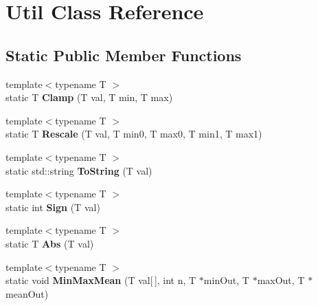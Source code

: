 \hypertarget{class_util}{
\section{\-Util \-Class \-Reference}
\label{class_util}
}
\subsection*{\-Static \-Public \-Member \-Functions}
\begin{DoxyCompactItemize}
\item 
\hypertarget{class_util_ae96fb04ebf846f501ebd96d7455027a9}{
{\footnotesize template$<$typename T $>$ }\\static \-T {\bfseries \-Clamp} (\-T val, \-T min, \-T max)}
\label{class_util_ae96fb04ebf846f501ebd96d7455027a9}

\item 
\hypertarget{class_util_a104bdc57a1eba1e8863f8139985e9b05}{
{\footnotesize template$<$typename T $>$ }\\static \-T {\bfseries \-Rescale} (\-T val, \-T min0, \-T max0, \-T min1, \-T max1)}
\label{class_util_a104bdc57a1eba1e8863f8139985e9b05}

\item 
\hypertarget{class_util_a120427fa00fd2e48bcc5b48088aeef84}{
{\footnotesize template$<$typename T $>$ }\\static std\-::string {\bfseries \-To\-String} (\-T val)}
\label{class_util_a120427fa00fd2e48bcc5b48088aeef84}

\item 
\hypertarget{class_util_ae608455719c51e7478f56a1366f50a1e}{
{\footnotesize template$<$typename T $>$ }\\static int {\bfseries \-Sign} (\-T val)}
\label{class_util_ae608455719c51e7478f56a1366f50a1e}

\item 
\hypertarget{class_util_a1e847664f26f1a545b1c8414ec8bbc90}{
{\footnotesize template$<$typename T $>$ }\\static \-T {\bfseries \-Abs} (\-T val)}
\label{class_util_a1e847664f26f1a545b1c8414ec8bbc90}

\item 
\hypertarget{class_util_a2a09028ede419c2da1f1e308fa811a73}{
{\footnotesize template$<$typename T $>$ }\\static void {\bfseries \-Min\-Max\-Mean} (\-T val\mbox{[}$\,$\mbox{]}, int n, \-T $\ast$min\-Out, \-T $\ast$max\-Out, \-T $\ast$mean\-Out)}
\label{class_util_a2a09028ede419c2da1f1e308fa811a73}


\end{DoxyCompactItemize}
